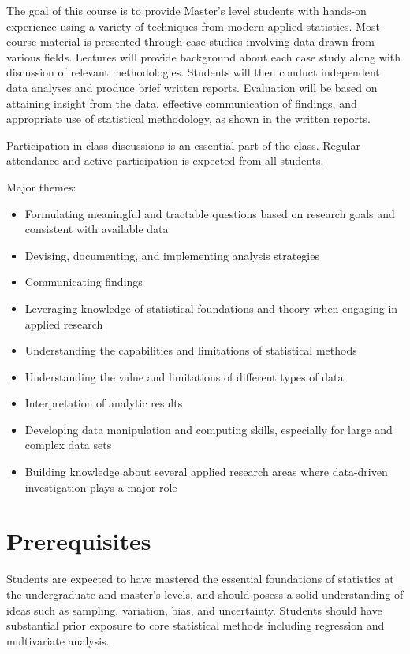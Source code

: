 \documentclass[11pt]{article}
\begin{document}
The goal of this course is to provide Master’s level students with hands-on experience using a variety of techniques from modern applied statistics.
Most course material is presented through case studies involving data drawn from various fields.
Lectures will provide background about each case study along with discussion of relevant methodologies.
Students will then conduct independent data analyses and produce brief written reports.
Evaluation will be based on attaining insight from the data, effective communication of findings, and appropriate use of statistical methodology, as shown in the written reports.

Participation in class discussions is an essential part of the class.
Regular attendance and active participation is expected from all students.

Major themes:
\begin{itemize}
	\item Formulating meaningful and tractable questions based on research goals and consistent with available data
	\item Devising, documenting, and implementing analysis strategies
	\item Communicating findings
	\item Leveraging knowledge of statistical foundations and theory when engaging in applied research
	\item Understanding the capabilities and limitations of statistical methods
	\item Understanding the value and limitations of different types of data
	\item Interpretation of analytic results
	\item Developing data manipulation and computing skills, especially for large and complex data sets
	\item Building knowledge about several applied research areas where data-driven investigation plays a major role
\end{itemize}

\section*{Prerequisites}

Students are expected to have mastered the essential foundations of statistics at the undergraduate and master’s levels, and should posess a solid understanding of ideas such as sampling, variation, bias, and uncertainty. Students should have substantial prior exposure to core statistical methods including regression and multivariate analysis.
\end{document}
